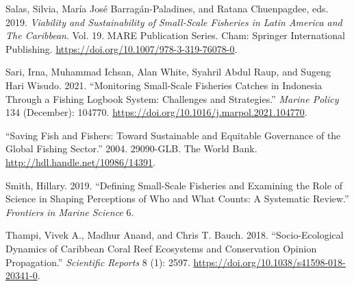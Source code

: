 \documentclass[
]{article}
\newlength{\cslhangindent}
\newlength{\cslentryspacingunit} %
\newenvironment{CSLReferences}[2] %
 {%
  \setlength{\parindent}{0pt}
  \ifodd #1
  \let\oldpar\par
  \def\par{\hangindent=\cslhangindent\oldpar}
  \fi
  \setlength{\parskip}{#2\cslentryspacingunit}
 }%
 {}
\begin{document}
\begin{CSLReferences}{1}{0}
\leavevmode{}%
Salas, Silvia, María José Barragán-Paladines, and Ratana Chuenpagdee, eds. 2019. \emph{Viability and {Sustainability} of {Small}-{Scale} {Fisheries} in {Latin} {America} and {The} {Caribbean}}. Vol. 19. {MARE} {Publication} {Series}. Cham: Springer International Publishing. \url{https://doi.org/10.1007/978-3-319-76078-0}.

\leavevmode{}%
Sari, Irna, Muhammad Ichsan, Alan White, Syahril Abdul Raup, and Sugeng Hari Wisudo. 2021. {``Monitoring Small-Scale Fisheries Catches in {Indonesia} Through a Fishing Logbook System: {Challenges} and Strategies.''} \emph{Marine Policy} 134 (December): 104770. \url{https://doi.org/10.1016/j.marpol.2021.104770}.

\leavevmode{}%
{``Saving {Fish} and {Fishers}: {Toward} {Sustainable} and {Equitable} {Governance} of the {Global} {Fishing} {Sector}.''} 2004. 29090-GLB. The World Bank. \url{http://hdl.handle.net/10986/14391}.

\leavevmode{}%
Smith, Hillary. 2019. {``Defining {Small}-{Scale} {Fisheries} and {Examining} the {Role} of {Science} in {Shaping} {Perceptions} of {Who} and {What} {Counts}: {A} {Systematic} {Review}.''} \emph{Frontiers in Marine Science} 6.

\leavevmode{}%
Thampi, Vivek A., Madhur Anand, and Chris T. Bauch. 2018. {``Socio-Ecological Dynamics of {Caribbean} Coral Reef Ecosystems and Conservation Opinion Propagation.''} \emph{Scientific Reports} 8 (1): 2597. \url{https://doi.org/10.1038/s41598-018-20341-0}.

\end{CSLReferences}
\end{document}
